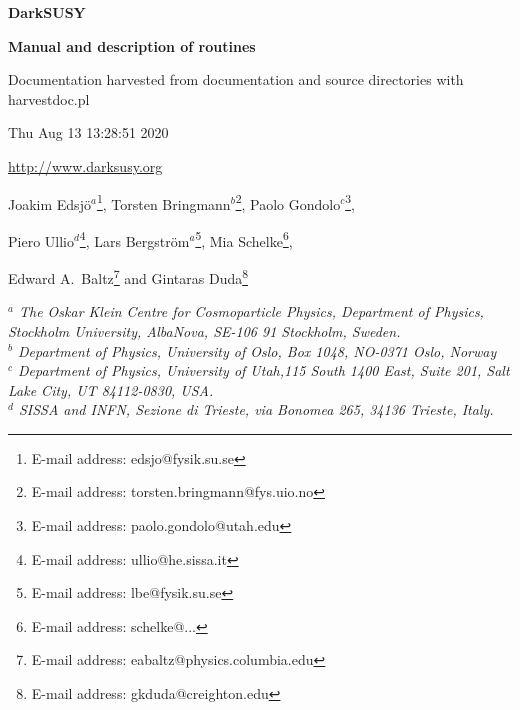 \documentclass[a4paper,10pt,oneside]{book}
\begin{document}
\centerline{}

\vspace{2cm}

\centerline{\LARGE \bfseries DarkSUSY }

\bigskip
\bigskip

\centerline{\Huge \bfseries \sffamily Manual and description of routines}

\smallskip
\centerline{\Large \bfseries \sffamily }
\smallskip

\vspace{1.5cm}

\centerline{\large Documentation harvested from documentation and source directories with harvestdoc.pl}
\smallskip

\centerline{Thu Aug 13 13:28:51 2020}

\bigskip

\centerline{\url{http://www.darksusy.org}}

\bigskip


{\Large \bfseries
\centerline{
Joakim Edsj\"o$^a$\footnote{E-mail address: edsjo@fysik.su.se},
Torsten Bringmann$^b$\footnote{E-mail address: torsten.bringmann@fys.uio.no},
Paolo Gondolo$^c$\footnote{E-mail address: paolo.gondolo@utah.edu},}
\smallskip
\centerline{
Piero Ullio$^d$\footnote{E-mail address: ullio@he.sissa.it},
Lars Bergstr\"om$^a$\footnote{E-mail address: lbe@fysik.su.se},
Mia Schelke\footnote{E-mail address: schelke@...},}
\smallskip
\centerline{
Edward A.~Baltz\footnote{E-mail address: eabaltz@physics.columbia.edu} and
Gintaras Duda\footnote{E-mail address: gkduda@creighton.edu}}
}
\bigskip


\begin{centering}
\em 
{}$^a$ The Oskar Klein Centre for Cosmoparticle Physics, Department of Physics, 
   Stockholm University, AlbaNova, SE-106 91 Stockholm, Sweden.\\
\smallskip
{}$^b$ Department of Physics, University of Oslo, Box 1048, NO-0371 Oslo, Norway\\
\smallskip
{}$^c$ Department of Physics, University of Utah,115 South 1400 East, Suite 201, 
  Salt Lake City, UT 84112-0830, USA.\\
\smallskip
{}$^d$ SISSA and INFN, Sezione di Trieste, via Bonomea 265, 34136 Trieste, Italy.\\
%
\end{centering}
\end{document}
